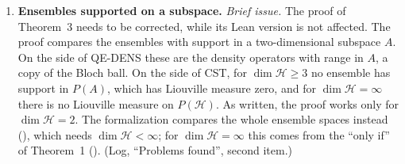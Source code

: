 \documentclass[11pt]{article}
\begin{document}
\begin{enumerate}
  as they are. The alternative keeps $1 \le \dim V$, also excludes the empty space and restricts
  Theorem~3 to $\dim\mathcal H \ge 2$. (Log, ``Problems found'', first three items.)
\item \textbf{Ensembles supported on a subspace.} \emph{Brief issue.} The proof of Theorem~3
  needs to be corrected, while its Lean version is not affected. The proof compares the ensembles
  with support in a two-dimensional subspace $A$. On the side of QE-DENS these are the density
  operators with range in $A$, a copy of the Bloch ball. On the side of CST, for
  $\dim\mathcal H \ge 3$ no ensemble has support in $P(A)$, which has Liouville measure zero,
  and for $\dim\mathcal H = \infty$ there is no Liouville measure on $P(\mathcal H)$. As written,
  the proof works only for $\dim\mathcal H = 2$. The formalization compares the whole ensemble
  spaces instead (), which needs $\dim\mathcal H < \infty$; for
  $\dim\mathcal H = \infty$ this comes from the ``only if'' of Theorem~1
  (). (Log, ``Problems found'', second item.)


\end{enumerate}
\end{document}
